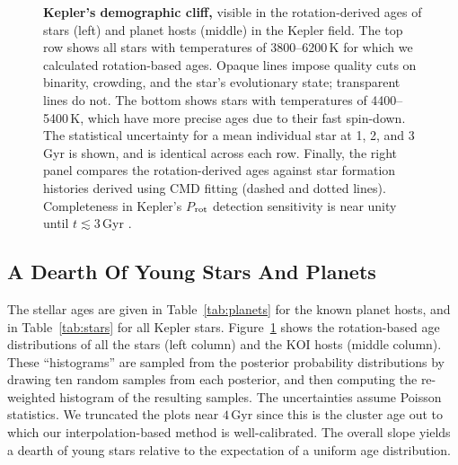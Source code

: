 \documentclass[11pt,twocolumn,tighten]{aastex63}
\begin{document}
\begin{figure}[!t]
  \begin{center}
    \leavevmode

	\vspace{-0.35cm}
  \end{center}
  \vspace{-0.66cm}
  \caption{{\bf Kepler's demographic cliff,} visible in the
  rotation-derived ages of stars (left) and planet hosts (middle) in
  the Kepler field.  The top row shows all stars with
  temperatures of 3800--6200\,K for which we calculated rotation-based
  ages.  Opaque lines impose quality cuts on 
  binarity, crowding, and the star's evolutionary state; transparent lines do not.
  The bottom
  shows stars with temperatures of 4400--5400\,K, which have
  more precise ages due to their fast spin-down.
  The statistical uncertainty for a mean
  individual star at 1, 2, and 3\,Gyr is shown, and is identical
  across each row.  Finally, the right panel compares the
  rotation-derived ages against star formation histories
  derived using CMD fitting (dashed and dotted lines).  Completeness in Kepler's
  $P$$_{\rm rot}$ detection sensitivity is near unity until
  $t$$\lesssim$3\,Gyr \citep{2022ApJ...937...94M}.
  \label{fig:hist_tgyro}
  }
\end{figure}


\subsection{A Dearth Of Young Stars And Planets}

The stellar ages are given in Table~\ref{tab:planets} for the known
planet hosts, and in Table~\ref{tab:stars} for all Kepler stars.
Figure~\ref{fig:hist_tgyro} shows the rotation-based age distributions
of all the stars (left column) and the KOI hosts (middle column).
These ``histograms'' are sampled from the posterior probability
distributions by drawing ten random samples from each posterior, and
then computing the re-weighted histogram of the resulting samples.
The uncertainties assume Poisson statistics.  We truncated the plots
near $4$\,Gyr since this is the cluster age out to which our
interpolation-based method is well-calibrated.  The overall slope
yields a dearth of young stars relative to the expectation of a
uniform age distribution.
\end{document}
